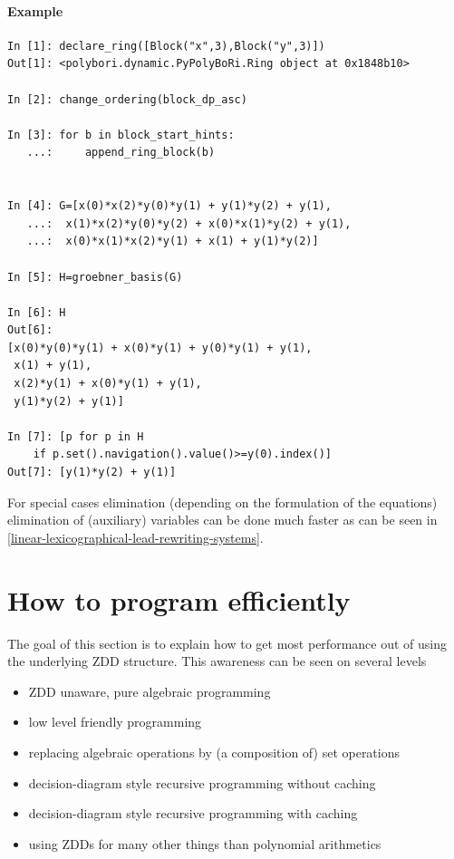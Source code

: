 \paragraph{Example} %
\label{par:example-elimination}
\begin{lstlisting}
In [1]: declare_ring([Block("x",3),Block("y",3)])
Out[1]: <polybori.dynamic.PyPolyBoRi.Ring object at 0x1848b10>

In [2]: change_ordering(block_dp_asc)

In [3]: for b in block_start_hints:
   ...:     append_ring_block(b)
     

In [4]: G=[x(0)*x(2)*y(0)*y(1) + y(1)*y(2) + y(1),
   ...:  x(1)*x(2)*y(0)*y(2) + x(0)*x(1)*y(2) + y(1),
   ...:  x(0)*x(1)*x(2)*y(1) + x(1) + y(1)*y(2)]

In [5]: H=groebner_basis(G)

In [6]: H
Out[6]: 
[x(0)*y(0)*y(1) + x(0)*y(1) + y(0)*y(1) + y(1),
 x(1) + y(1),
 x(2)*y(1) + x(0)*y(1) + y(1),
 y(1)*y(2) + y(1)]

In [7]: [p for p in H 
    if p.set().navigation().value()>=y(0).index()]
Out[7]: [y(1)*y(2) + y(1)]
\end{lstlisting}

For special cases elimination (depending on the formulation of the equations) elimination of (auxiliary) variables can be done much faster as can be seen in \ref{linear-lexicographical-lead-rewriting-systems}.



\section{How to program ef{}f{}iciently}
\label{sec:program-efficiently}
The goal of this section is to explain how to get most performance out of \PolyBoRi using the underlying ZDD structure.
This awareness can be seen on several levels
\begin{itemize}
    \item ZDD unaware, pure algebraic programming 
    \item low level friendly programming
    \item replacing algebraic operations by (a composition of) set operations
    \item decision-diagram style recursive programming without caching
    \item decision-diagram style recursive programming with caching
    \item using ZDDs for many other things than polynomial arithmetics
\end{itemize}
